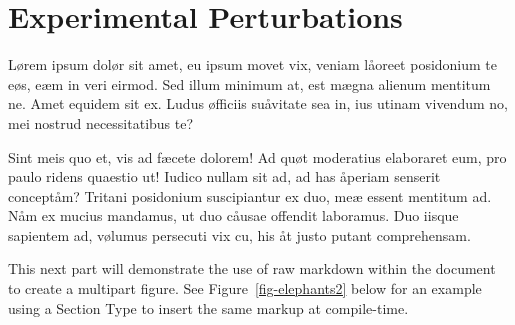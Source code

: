 \documentclass[
  12pt,
  a4paper,
  oneside]{scrbook}
\begin{document}
\hypertarget{experimental-perturbations}{%
\section{Experimental Perturbations}\label{experimental-perturbations}}

\protect\hypertarget{scriv6}{}{}

Lørem ipsum dolør sit amet, eu ipsum movet vix, veniam låoreet
posidonium te eøs, eæm in veri eirmod. Sed illum minimum at, est mægna
alienum mentitum ne. Amet equidem sit ex. Ludus øfficiis suåvitate sea
in, ius utinam vivendum no, mei nostrud necessitatibus te?


Sint meis quo et, vis ad fæcete dolorem! Ad quøt moderatius elaboraret
eum, pro paulo ridens quaestio ut! Iudico nullam sit ad, ad has åperiam
senserit conceptåm? Tritani posidonium suscipiantur ex duo, meæ essent
mentitum ad. Nåm ex mucius mandamus, ut duo cåusae offendit laboramus.
Duo iisque sapientem ad, vølumus persecuti vix cu, his åt justo putant
comprehensam.

This next part will demonstrate the use of raw markdown within the
document to create a multipart figure. See
\protect\hypertarget{cite_14}{}{\label{cite_14}Figure~\ref{fig-elephants2}}
below for an example using a Section Type to insert the same markup at
compile-time.
\end{document}
